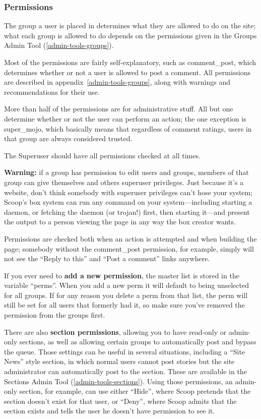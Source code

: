 \subsubsection{Permissions}
\label{user-perms}

The group a user is placed in determines what they are allowed to do on the site; what each group is allowed to do depends on the permissions given in the Groups Admin Tool (\ref{admin-tools-groups}).

Most of the permissions are fairly self-explanatory, such as comment\_post, which determines whether or not a user is allowed to post a comment.  All permissions are described in appendix~\ref{admin-tools-groups}, along with warnings and recommendations for their use.

More than half of the permissions are for administrative stuff.  All but one determine whether or not the user can perform an action; the one exception is super\_mojo, which basically means that regardless of comment ratings, users in that group are always considered trusted.

The Superuser should have all permissions checked at all times.  

{\bf Warning:} if a group has permission to edit users and groups, members of that group can give themselves and others superuser privileges.  Just because it's a website, don't think somebody with superuser privileges can't hose your system; Scoop's box system can run any command on your system---including starting a daemon, or fetching the daemon (or trojan!) first, then starting it---and present the output to a person viewing the page in any way the box creator wants.

Permissions are checked both when an action is attempted and when building the page; somebody without the comment\_post permission, for example, simply will not see the ``Reply to this'' and ``Post a comment'' links anywhere.

If you ever need to {\bf add a new permission}, the master list is stored in the variable ``perms''.  When you add a new perm it will default to being unselected for all groups.  If for any reason you delete a perm from that list, the perm will still be set for all users that formerly had it, so make sure you've removed the permission from the groups first.

There are also {\bf section permissions}, allowing you to have read-only or admin-only sections, as well as allowing certain groups to automatically post and bypass the queue.  Those settings can be useful in several situations, including a ``Site News'' style section, in which normal users cannot post stories but the site administrator can automatically post to the section.  These are available in the Sections Admin Tool (\ref{admin-tools-sections}).  Using those permissions, an admin-only section, for example, can use either ``Hide'', where Scoop pretends that the section doesn't exist for that user, or ``Deny'', where Scoop admits that the section exists and tells the user he doesn't have permission to see it.

